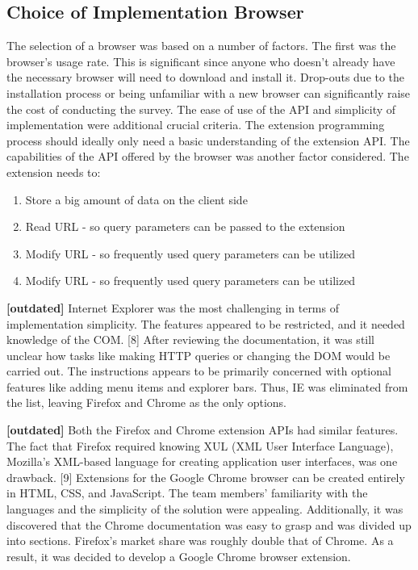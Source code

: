 \subsection{Choice of Implementation Browser}
The selection of a browser was based on a number of factors. The first was the browser's usage rate. This is significant since anyone who doesn't already have the necessary browser will need to download and install it. Drop-outs due to the installation process or being unfamiliar with a new browser can significantly raise the cost of conducting the survey. The ease of use of the API and simplicity of implementation were additional crucial criteria. The extension programming process should ideally only need a basic understanding of the extension API. The capabilities of the API offered by the browser was another factor considered. The extension needs to:

\begin{enumerate}
  \item Store a big amount of data on the client side
  \item Read URL - so query parameters can be passed to the extension
  \item Modify URL - so frequently used query parameters can be utilized
  \item Modify URL - so frequently used query parameters can be utilized
\end{enumerate}

\textbf{[outdated]} Internet Explorer was the most challenging in terms of implementation simplicity. The features appeared to be restricted, and it needed knowledge of the COM. [8] After reviewing the documentation, it was still unclear how tasks like making HTTP queries or changing the DOM would be carried out. The instructions appears to be primarily concerned with optional features like adding menu items and explorer bars. Thus, IE was eliminated from the list, leaving Firefox and Chrome as the only options.

\textbf{[outdated]} Both the Firefox and Chrome extension APIs had similar features. The fact that Firefox required knowing XUL (XML User Interface Language), Mozilla's XML-based language for creating application user interfaces, was one drawback. [9] Extensions for the Google Chrome browser can be created entirely in HTML, CSS, and JavaScript. The team members' familiarity with the languages and the simplicity of the solution were appealing. Additionally, it was discovered that the Chrome documentation was easy to grasp and was divided up into sections. Firefox's market share was roughly double that of Chrome. As a result, it was decided to develop a Google Chrome browser extension.

